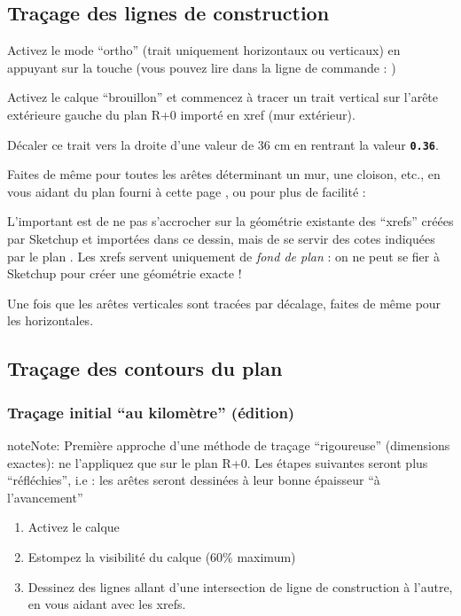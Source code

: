 \documentclass[a4paper,12pt,french]{sphinxmanual}
\begin{document}
\subsection{Traçage des lignes de construction}
\label{init_su+acad/acad1:tracage-des-lignes-de-construction}
Activez le mode ``ortho'' (trait uniquement horizontaux ou verticaux) en appuyant sur la touche  (vous pouvez lire dans la ligne de commande : )

Activez le calque ``brouillon'' et commencez à tracer un trait vertical sur l'arête extérieure gauche du plan R+0 importé en xref (mur extérieur).

Décaler ce trait vers la droite d'une valeur de 36 cm en rentrant la valeur \textbf{\texttt{0.36}}.

Faites de même pour toutes les arêtes déterminant un mur, une cloison, etc., en vous aidant du plan fourni à cette page {\hyperref[init_su+acad/su1:porkeno\string-plans\string-simples]{}}, ou pour plus de facilité :  

L'important est de ne pas s'accrocher sur la géométrie existante des ``xrefs'' créées par Sketchup et importées dans ce dessin, mais de se servir des cotes indiquées par le plan . Les xrefs servent uniquement de \emph{fond de plan} : on ne peut se fier à Sketchup pour créer une géométrie exacte !

Une fois que les arêtes verticales sont tracées par décalage, faites de même pour les horizontales.


\subsection{Traçage des contours du plan}
\label{init_su+acad/acad1:tracage-des-contours-du-plan}

\subsubsection{Traçage initial ``au kilomètre'' (édition)}
\label{init_su+acad/acad1:tracage-initial-au-kilometre-edition}
\begin{notice}{note}{Note:}
Première approche d'une méthode de traçage ``rigoureuse'' (dimensions exactes): ne l'appliquez que sur le plan R+0. Les étapes suivantes seront plus ``réfléchies'', i.e : les arêtes seront dessinées à leur bonne épaisseur ``à l'avancement''
\end{notice}
\begin{enumerate}
\item {} 
Activez le calque 

\item {} 
Estompez la visibilité du calque  (60\% maximum)

\item {} 
Dessinez des lignes allant d'une intersection de ligne de construction à l'autre, en vous aidant avec les xrefs.

\end{enumerate}
\end{document}
